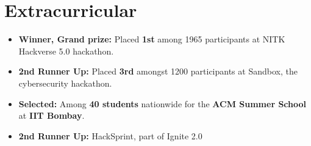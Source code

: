 \documentclass[letterpaper,11pt]{article}
\newcommand{\resumeSubHeadingListEnd}{\end{itemize}}
\begin{document}


\section{Extracurricular} \vspace{0.5pt}
\begin{itemize}[leftmargin=0.15in, label={}, itemsep=0.08em, topsep=1pt]
    \item \textbf{Winner, Grand prize:} Placed \textbf{1st} among 1965 participants at NITK Hackverse 5.0 hackathon.
    \item \textbf{2nd Runner Up:} Placed \textbf{3rd} amongst 1200 participants at Sandbox, the cybersecurity hackathon. 
    \item \textbf{Selected:} Among \textbf{40 students} nationwide for the \textbf{ACM  Summer School} at \textbf{IIT Bombay}.
    \item \textbf{2nd Runner Up:} HackSprint, part of Ignite 2.0
\end{itemize}
\end{document}
